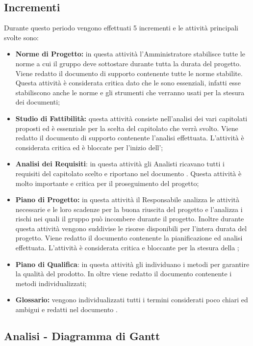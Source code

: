 \documentclass[PianoDiProgetto.tex]{subfiles}
\begin{document}
\subsection{Incrementi}
Durante questo periodo vengono effettuati 5 incrementi e le attività principali svolte sono:
\begin{itemize}
	\item \textbf{Norme di Progetto:}
	in questa attività l'Amministratore stabilisce tutte le norme a cui il gruppo \gruppo deve sottostare durante tutta la durata del progetto. Viene redatto il documento di supporto \ndp contenente tutte le norme stabilite. Questa attività è considerata critica dato che le \ndp sono essenziali, infatti esse stabiliscono anche le norme e gli strumenti che verranno usati per la stesura dei documenti;
	
	
	\item \textbf{Studio di Fattibilità:} 
	questa attività consiste nell'analisi dei vari capitolati proposti ed è essenziale per la scelta del capitolato che verrà svolto. Viene redatto il documento di supporto \sdf contenente l'analisi effettuata. L'attività è considerata critica ed è bloccate per l'inizio dell'\adr;
		
	\item \textbf{Analisi dei Requisiti}: 
		in questa attività gli Analisti ricavano tutti i requisiti del capitolato scelto e riportano nel documento \adr. Questa attività è molto importante e critica per il proseguimento del progetto;
	
	\item \textbf{Piano di Progetto:} in questa attività il Responsabile analizza le attività necessarie e le loro scadenze per la buona riuscita del progetto e l'\amme analizza i rischi nei quali il gruppo \gruppo può incombere durante il progetto.  Inoltre durante questa attività vengono suddivise le risorse disponibili per l'intera durata del progetto. Viene redatto il documento \pdp contenente la pianificazione ed analisi effettuata. L'attività è considerata critica e bloccante per la stesura della ;
	\item \textbf{Piano di Qualifica}: in questa attività gli \ammi individuano i metodi per garantire la qualità del prodotto. In oltre viene redatto il documento \pdq contenente i metodi individualizzati;
	\item \textbf{Glossario:} vengono individualizzati tutti i termini considerati poco chiari ed ambigui e redatti nel documento \g.
		
\end{itemize}	 
\begin{landscape}
\subsection{Analisi - Diagramma di Gantt}
\end{landscape}	
\end{document}
